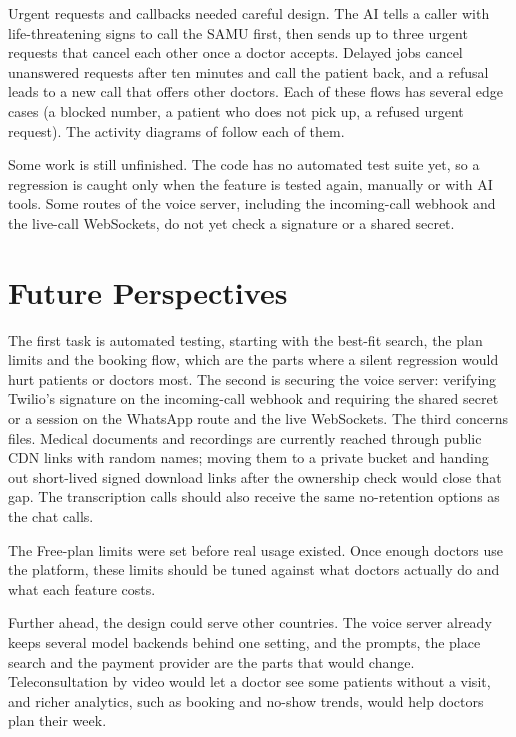 Urgent requests and callbacks needed careful design. The AI tells a caller with life-threatening signs to call the SAMU first, then sends up to three urgent requests that cancel each other once a doctor accepts. Delayed jobs cancel unanswered requests after ten minutes and call the patient back, and a refusal leads to a new call that offers other doctors. Each of these flows has several edge cases (a blocked number, a patient who does not pick up, a refused urgent request). The activity diagrams of  follow each of them.

Some work is still unfinished. The code has no automated test suite yet, so a regression is caught only when the feature is tested again, manually or with AI tools. Some routes of the voice server, including the incoming-call webhook and the live-call WebSockets, do not yet check a signature or a shared secret.

\section*{Future Perspectives}

The first task is automated testing, starting with the best-fit search, the plan limits and the booking flow, which are the parts where a silent regression would hurt patients or doctors most. The second is securing the voice server: verifying Twilio's signature on the incoming-call webhook and requiring the shared secret or a session on the WhatsApp route and the live WebSockets. The third concerns files. Medical documents and recordings are currently reached through public CDN links with random names; moving them to a private bucket and handing out short-lived signed download links after the ownership check would close that gap. The transcription calls should also receive the same no-retention options as the chat calls.

The Free-plan limits were set before real usage existed. Once enough doctors use the platform, these limits should be tuned against what doctors actually do and what each feature costs.

Further ahead, the design could serve other countries. The voice server already keeps several model backends behind one setting, and the prompts, the place search and the payment provider are the parts that would change. Teleconsultation by video would let a doctor see some patients without a visit, and richer analytics, such as booking and no-show trends, would help doctors plan their week.
